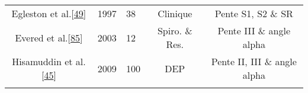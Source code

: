 \documentclass[12pt,]{article}
\begin{document}
\begin{landscape}
\begin{longtable}[]{@{}cllcc@{}}
\begin{minipage}[t]{0.31\columnwidth}
Egleston et
al.{[}\protect\hyperlink{ref-egleston1997capnography}{49}{]}\strut
\end{minipage} & \begin{minipage}[t]{0.05\columnwidth}\raggedright
1997\strut
\end{minipage} & \begin{minipage}[t]{0.06\columnwidth}\raggedright
38\strut
\end{minipage} & \begin{minipage}[t]{0.12\columnwidth}\centering
Clinique\strut
\end{minipage} & \begin{minipage}[t]{0.32\columnwidth}\centering
Pente S1, S2 \& SR\strut
\end{minipage}\tabularnewline
\begin{minipage}[t]{0.31\columnwidth}\centering
Evered et al.{[}\protect\hyperlink{ref-evered2003can}{85}{]}\strut
\end{minipage} & \begin{minipage}[t]{0.05\columnwidth}\raggedright
2003\strut
\end{minipage} & \begin{minipage}[t]{0.06\columnwidth}\raggedright
12\strut
\end{minipage} & \begin{minipage}[t]{0.12\columnwidth}\centering
Spiro. \& Res.\strut
\end{minipage} & \begin{minipage}[t]{0.32\columnwidth}\centering
Pente III \& angle alpha\strut
\end{minipage}\tabularnewline
\begin{minipage}[t]{0.31\columnwidth}\centering
Hisamuddin et
al.{[}\protect\hyperlink{ref-hisamuddin2009correlations}{45}{]}\strut
\end{minipage} & \begin{minipage}[t]{0.05\columnwidth}\raggedright
2009\strut
\end{minipage} & \begin{minipage}[t]{0.06\columnwidth}\raggedright
100\strut
\end{minipage} & \begin{minipage}[t]{0.12\columnwidth}\centering
DEP\strut
\end{minipage} & \begin{minipage}[t]{0.32\columnwidth}\centering
Pente II, III \& angle alpha\strut
\end{minipage}\tabularnewline
\begin{minipage}[t]{0.31\columnwidth}\centering

\end{minipage}
\end{longtable}
\end{landscape}
\end{document}

